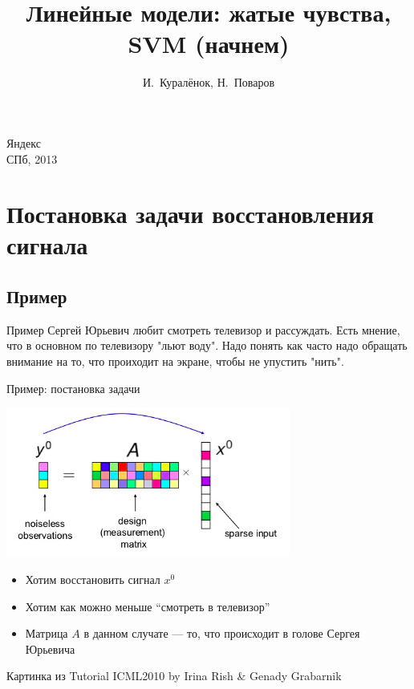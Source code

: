 \documentclass[14pt, fleqn, xcolor={dvipsnames, table}]{beamer}
\title{Линейные модели: жатые чувства, SVM (начнем)\\\small{}}
\author[]{\small{%
И.~Куралёнок,
Н.~Поваров}}
\date{}
\begin{document}
\begin{frame}

\maketitle
\small
\begin{center}
\vspace{-60pt}
\normalsize {\color{red}Я}ндекс \\
\vspace{80pt}
\footnotesize СПб, 2013
\end{center}
\end{frame}
\section{Постановка задачи восстановления сигнала}
\subsection{Пример}
\begin{frame}{Пример}
Сергей Юрьевич любит смотреть телевизор и рассуждать. Есть мнение, что в основном по телевизору "льют воду".
Надо понять как часто надо обращать внимание на то, что проиходит на экране, чтобы не упустить "нить".
\end{frame}
\begin{frame}{Пример: постановка задачи}
\begin{center}
\includegraphics[width=0.7\textwidth]{CS-ProblemSetup-1.png}
\end{center}
\vspace{-1em}
\small
\begin{itemize}
  \item Хотим восстановить сигнал $x^0$
  \item Хотим как можно меньше ``смотреть в телевизор''
  \item Матрица $A$ в данном случате --- то, что происходит в голове Сергея Юрьевича
\end{itemize}
\footnotesize Картинка из Tutorial ICML2010 by Irina Rish \& Genady Grabarnik
\end{frame}
\end{document}
